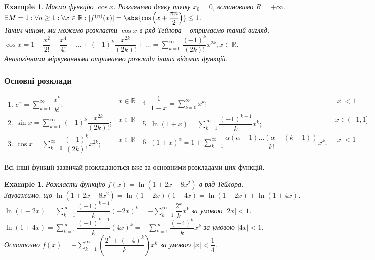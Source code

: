 \documentclass[a4paper, 10pt]{article}
\def\huge{\displaystyle}
\theoremstyle{theoremdd}
\theoremstyle{theoremdd}
\theoremstyle{theoremdd}
\theoremstyle{theoremdd}
\theoremstyle{theoremdd}
\newtheorem{example}[theorem]{Example}
\theoremstyle{theoremdd}
\theoremstyle{theoremdd}
\theoremstyle{theoremdd}
\theoremstyle{theoremdd}
\newtheorem{corollary}[theorem]{Corollary}
\begin{document}
\iffalse
\begin{corollary}
Ряд Тейлора для суми степеневого ряду співпадають с самим степеневим рядом на області збіжності.
\end{corollary}
\fi

\begin{example}
Маємо функцію $\cos x$. Розглянемо деяку точку $x_0 = 0$, встановимо $R = +\infty$.\\
$\exists M = 1: \forall n \geq 1: \forall x \in \mathbb{R}: |f^{(n)}(x)| = \abs{\cos \left( x + \dfrac{\pi n}{2} \right)} \leq 1$.\\
Таким чином, ми можемо розкласти $\cos x$ в ряд Тейлора -- отримаємо такий вигляд:\\
$\cos x = 1 - \dfrac{x^2}{2!} + \dfrac{x^4}{4!} - \dots + (-1)^k \dfrac{x^{2k}}{(2k)!} + \dots = \huge\sum_{k=0}^\infty \dfrac{(-1)^k}{(2k)!} x^{2k}, x \in \mathbb{R}$.\\
Аналогічними міркуваннями отримаємо розклади інших відомих функцій.
\end{example}

\subsubsection*{Основні розклади}
\begin{tabular}{ll|ll}
1. $e^x = \huge\sum_{k=0}^\infty \dfrac{x^k}{k!}$; & $x \in \mathbb{R}$ & 4. $\dfrac{1}{1-x} = \huge\sum_{k=0}^\infty x^k$; & $ |x| < 1$\\
2. $\sin x = \huge\sum_{k=0}^\infty (-1)^{k} \dfrac{x^{2k}}{(2k)!}$; & $x \in \mathbb{R}$ & 5. $\ln (1+x) = \huge\sum_{k=1}^\infty \dfrac{(-1)^{k+1}}{k} x^k$; & $x \in (-1,1]$\\
3. $\cos x = \huge\sum_{k=0}^\infty \dfrac{(-1)^k}{(2k)!} x^{2k}$; & $x \in \mathbb{R}$ & 6. $(1+x)^\alpha = 1 + \huge\sum_{k=1}^\infty \dfrac{\alpha (\alpha-1) \dots (\alpha - (k-1))}{k!}x^k;$ & $|x| < 1$
\end{tabular}

Всі інші функції зазвичай розкладаються вже за основними розкладами цих функцій.

\begin{example}
Розкласти функцію $f(x) = \ln (1+2x-8x^2)$ в ряд Тейлора.\\
Зауважимо, що $\ln (1+2x-8x^2) = \ln (1-2x)(1+4x) = \ln (1-2x) + \ln (1+4x)$.\\
$\ln (1-2x) =  \huge\sum_{k=1}^\infty \dfrac{(-1)^{k+1}}{k}(-2x)^k =- \sum_{k=1}^\infty \dfrac{2^k}{k}x^k$ за умовою $|2x| < 1$.\\
$\ln (1+4x) = \huge\sum_{k=1}^\infty \dfrac{(-1)^{k+1}}{k} (4x)^k = -\sum_{k=1}^\infty \dfrac{(-4)^k}{k}x^k$ за умовою $|4x| < 1$.\\
Остаточно $f(x) = -\huge\sum_{k=1}^\infty \left( \dfrac{2^k+(-4)^k}{k} \right) x^k$ за умовою $|x| < \dfrac{1}{4}$.
\end{example}
\newpage
\end{document}

